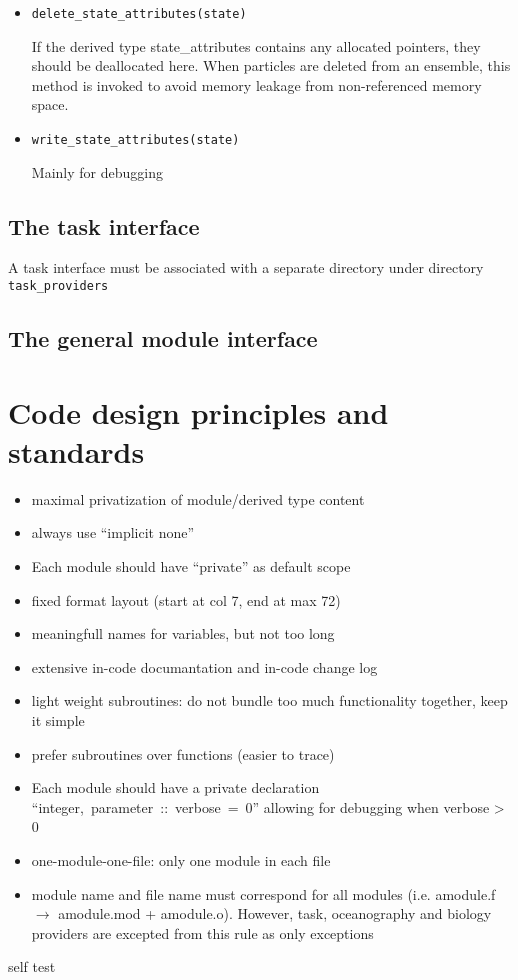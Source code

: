 \begin{itemize}
\item {\tt  delete\_state\_attributes(state)}  

If the derived type state\_attributes contains any allocated
pointers, they should be deallocated here. When particles are
deleted from an ensemble, this method is invoked to avoid
memory leakage from non-referenced memory space.


\item {\tt  write\_state\_attributes(state)} 

Mainly for debugging


\end{itemize}

\section{The task interface}

A task interface
must be associated with a separate directory under directory {\tt task\_providers}



\section{The general module interface}


\chapter{Code design principles and standards}

\begin{itemize}
  \item maximal privatization of module/derived type content
  \item always use ``implicit none''
  \item Each module should have ``private'' as default scope 
  \item fixed format layout (start at col 7, end at max 72)
  \item meaningfull names for variables, but not too long
  \item extensive in-code documantation and in-code change log
  \item light weight subroutines: do not bundle too much functionality
        together, keep it simple
  \item prefer subroutines over functions (easier to trace) 
  \item Each module should have a private declaration 
        \hbox{``integer, parameter :: verbose = 0''}
        allowing for debugging when verbose > 0
  \item one-module-one-file: only one module in each file
  \item module name and file name must correspond for all
        modules (i.e. amodule.f $\rightarrow$ amodule.mod + amodule.o).
        However, task, oceanography and biology providers are 
        excepted from this rule as only exceptions
\end{itemize}
self test

